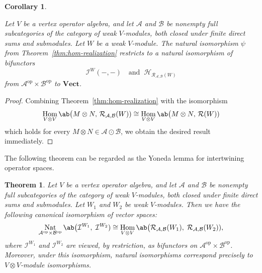 \documentclass[12pt, english]{article}
\numberwithin{equation}{section}
\DeclareMathOperator{\Hom}{Hom}
\DeclareMathOperator{\opp}{op}
\DeclareMathOperator{\Nat}{Nat}
\theoremstyle{plain}
\newtheorem{theorem}[lemma]{Theorem}
\newtheorem{corollary}[lemma]{Corollary}
\theoremstyle{definition}
\theoremstyle{remark}
\begin{document}
	\begin{corollary} \label{cor:generated-regular-hom-realization}
		
		Let $V$ be a vertex operator algebra, and let $\mathcal{A}$ and $\mathcal{B}$ be nonempty full subcategories of the category of weak $V$-modules, both closed under finite direct sums and submodules.
		Let $W$ be a weak $V$-module.
		The natural isomorphism $\psi$ from Theorem~\ref{thm:hom-realization} restricts to a natural isomorphism of bifunctors
		\[
		\mathcal{I}^{W}(-, -) \quad \text{and} \;\; \mathcal{H}_{\mathcal{R}_{\mathcal{A}, \mathcal{B}}(W)}
		\]
		from $\mathcal{A}^{\opp}\times\mathcal{B}^{\opp}$ to $\mathbf{Vect}$.
		
	\end{corollary}
	
	\begin{proof}
		Combining Theorem~\ref{thm:hom-realization} with the isomorphism
		\[
		\Hom_{V \otimes V} \ab\big(M \otimes N, \, \mathcal{R}_{\mathcal{A}, \mathcal{B}}(W)) \cong
		\Hom_{V \otimes V} \ab\big(M \otimes N, \, \mathcal{R}(W))
		\]
		which holds for every $M \otimes N \in \mathcal{A} \odot \mathcal{B}$,
		we obtain the desired result immediately.
	\end{proof}
	
	The following theorem can be regarded as the Yoneda lemma for intertwining operator spaces.
	\begin{theorem}\label{thm:intertwiner-yoneda}
		Let $V$ be a vertex operator algebra, and let $\mathcal{A}$ and $\mathcal{B}$ be nonempty full subcategories of the category of weak $V$-modules, both closed under finite direct sums and submodules.
		Let $W_1$ and $W_2$ be weak $V$-modules.
		Then we have the following canonical isomorphism of vector spaces:
		\[
		\Nat_{\mathcal{A}^{\opp}\times\mathcal{B}^{\opp}} \ab\big(\mathcal{I}^{W_1}, \; \mathcal{I}^{W_2}) \cong
		\Hom_{V \otimes V} \ab\big( \mathcal{R}_{ \mathcal{A}, \mathcal{B} }(W_1), \; \mathcal{R}_{ \mathcal{A}, \mathcal{B} }(W_2) ),
		\]
		where $\mathcal{I}^{W_1}$ and  $\mathcal{I}^{W_2}$ are viewed, by restriction, as bifunctors on  $\mathcal{A}^{\opp} \times \mathcal{B}^{\opp}$.
		Moreover, under this isomorphism, natural isomorphisms correspond precisely to $V\otimes V$-module isomorphisms.
	\end{theorem}
	
\end{document}
